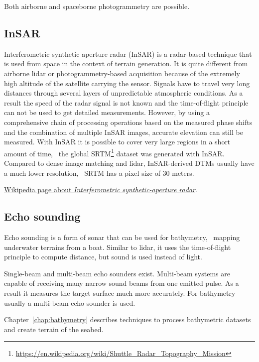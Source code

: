 Both airborne and spaceborne photogrammetry are possible.

\subsection{InSAR}

Interferometric synthetic aperture radar (InSAR) is a radar-based technique that is used from space in the context of terrain generation. 
It is quite different from airborne lidar or photo\-gramme\-try-based acquisition because of the extremely high altitude of the satellite carrying the sensor. 
Signals have to travel very long distances through several layers of unpredictable atmospheric conditions. 
As a result the speed of the radar signal is not known and the time-of-flight principle can not be used to get detailed measurements. 
However, by using a comprehensive chain of processing operations based on the measured phase shifts and the combination of multiple InSAR images, accurate elevation can still be measured. 
With InSAR it is possible to cover very large regions in a short amount of time, \eg\ the global SRTM\footnote{\url{https://en.wikipedia.org/wiki/Shuttle_Radar_Topography_Mission}} dataset was generated with InSAR\@. 
Compared to dense image matching and lidar, InSAR-derived DTMs usually have a much lower resolution, \eg\ SRTM has a pixel size of 30 meters.

\begin{kaobox}[frametitle=\faExternalLink\ To read or to watch.]
	\href{https://en.wikipedia.org/wiki/Interferometric_synthetic-aperture_radar}{Wikipedia page about \emph{Interferometric synthetic-aperture radar}}.
\end{kaobox}


\subsection{Echo sounding}%
\label{sec:mbes}
Echo sounding is a form of sonar that can be used for bathymetry, \ie\ mapping underwater terrains from a boat. 
Similar to lidar, it uses the time-of-flight principle to compute distance, but sound is used instead of light. 

Single-beam and multi-beam echo sounders exist. Multi-beam systems are capable of receiving many narrow sound beams from one emitted pulse. As a result it measures the target surface much more accurately. 
For bathymetry usually a multi-beam echo sounder is used.

Chapter~\ref{chap:bathymetry} describes techniques to process bathymetric datasets and create terrain of the seabed.

